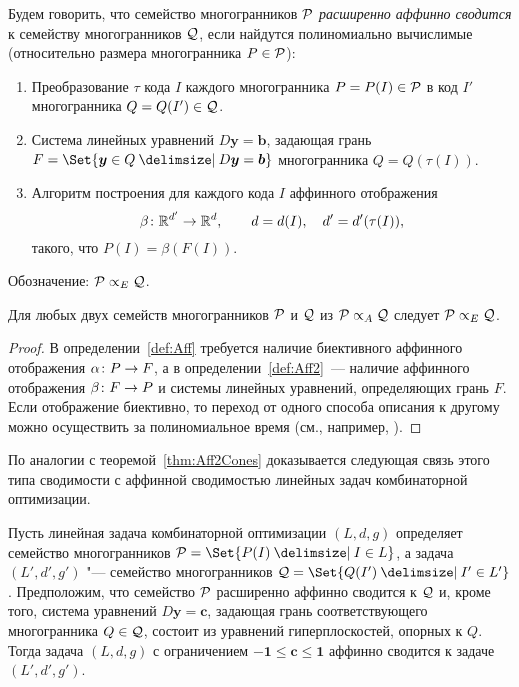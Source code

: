 \begin{definition}
	\label{def:Aff2}
	Будем говорить, что семейство многогранников ${\mathcal P}$ \emph{расширенно аффинно сводится} к семейству многогранников ${\mathcal Q}$, если найдутся полиномиально вычислимые (относительно размера многогранника $P\in {\mathcal P}$):
	\begin{enumerate}
		\item 
		Преобразование $\tau$ кода $I$ каждого многогранника $P = P(I)\in {\mathcal P}$ в код $I'$ многогранника $Q = Q(I') \in {\mathcal Q}$.
		\item 
		Система линейных уравнений $D\bm{y}=\bm{b}$, задающая грань
		\(F = \Set{\bm{y}\in Q \given D\bm{y}=\bm{b}}\)
		многогранника $Q = Q(\tau(I))$.
		\item 
		Алгоритм построения для каждого кода $I$ аффинного отображения
		\[
		\beta\colon \mathbb{R}^{d'} \to \mathbb{R}^{d}, \qquad d = d(I), \quad d' = d'(\tau(I)),
		\]
		такого, что $P(I) = \beta(F(I))$.
	\end{enumerate}
	Обозначение: ${\mathcal P} \propto_E {\mathcal Q}$.  
\end{definition}

\begin{lemma}
	Для любых двух семейств многогранников ${\mathcal P}$ и ${\mathcal Q}$ из ${\mathcal P} \propto_A {\mathcal Q}$ следует ${\mathcal P} \propto_E {\mathcal Q}$.
\end{lemma}
	
\begin{proof}
	В определении~\ref{def:Aff} требуется наличие биективного аффинного отображения $\alpha \colon P \to F$,
	а в определении~\ref{def:Aff2}~--- наличие аффинного отображения $\beta \colon F \to P$ и системы линейных уравнений, определяющих грань $F$.
	Если отображение биективно, то переход от одного способа описания к другому можно осуществить за полиномиальное время (см., например, \cite{Winkler:1996}).
\end{proof}

По аналогии с теоремой~\ref{thm:Aff2Cones} доказывается следующая связь этого типа сводимости с аффинной сводимостью линейных задач комбинаторной оптимизации.

\begin{theorem}
\label{thm:ExtAff2AffProblems}
Пусть линейная задача комбинаторной оптимизации $(L,d,g)$ определяет семейство многогранников $\Pf = \Set{P(I)\given I\in L}$, а задача $(L',d',g')$ "--- семейство многогранников $\Qf = \Set{Q(I')\given I'\in L'}$.
Предположим, что семейство ${\mathcal P}$ расширенно аффинно сводится к ${\mathcal Q}$ и, кроме того,
система уравнений $D\bm{y}=\bm{c}$, задающая грань соответствующего многогранника $Q \in {\mathcal Q}$, состоит из уравнений гиперплоскостей, опорных к $Q$.
Тогда задача $(L,d,g)$ с ограничением $\bm{-1} \le \bm{c} \le \bm{1}$ аффинно сводится к задаче $(L',d',g')$.
\end{theorem}


